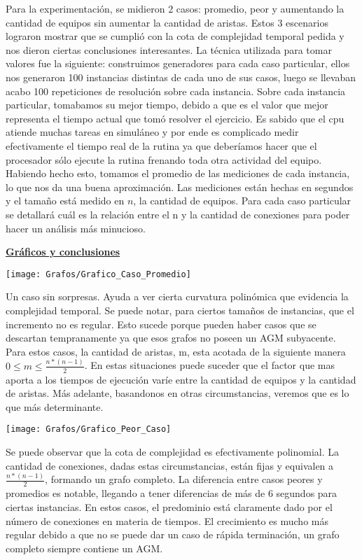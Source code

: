 Para la experimentación, se midieron 2 casos: promedio, peor y aumentando la cantidad de equipos sin aumentar la cantidad de aristas. Estos 3 escenarios lograron mostrar que se cumplió con la cota de complejidad temporal pedida y nos dieron ciertas conclusiones interesantes.
La técnica utilizada para tomar valores fue la siguiente: construimos generadores para cada caso particular, ellos nos generaron 100 instancias distintas de cada uno de sus casos, luego se llevaban acabo 100 repeticiones de resolución sobre cada instancia. Sobre cada instancia particular, tomabamos su mejor tiempo, debido a que es el valor que mejor representa el tiempo actual que tomó resolver el ejercicio. Es sabido que el cpu atiende muchas tareas en simuláneo y por ende es complicado medir efectivamente el tiempo real de la rutina ya que deberíamos hacer que el procesador sólo ejecute la rutina frenando toda otra actividad del equipo. Habiendo hecho esto, tomamos el promedio de las mediciones de cada instancia, lo que nos da una buena aproximación. Las mediciones están hechas en segundos y el tamaño está medido en $n$, la cantidad de equipos. Para cada caso particular se detallará cuál es la relación entre el n y la cantidad de conexiones para poder hacer un análisis más minucioso.

\noindent \textbf{\underline{Gráficos y conclusiones}}

\texttt{[image: Grafos/Grafico\_Caso\_Promedio]}

Un caso sin sorpresas. Ayuda a ver cierta curvatura polinómica que evidencia la complejidad temporal. Se puede notar, para ciertos tamaños de instancias, que el incremento no es regular. Esto sucede porque pueden haber casos que se descartan tempranamente ya que esos grafos no poseen un AGM subyacente. Para estos casos, la cantidad de aristas, m, esta acotada de la siguiente manera $0 \leq m \leq \frac{n*(n-1)}{2}$. En estas situaciones puede suceder que el factor que mas aporta a los tiempos de ejecución varíe entre la cantidad de equipos y la cantidad de aristas. Más adelante, basandonos en otras circumstancias, veremos que es lo que más determinante.

\texttt{[image: Grafos/Grafico\_Peor\_Caso]}

Se puede observar que la cota de complejidad es efectivamente polinomial. La cantidad de conexiones, dadas estas circumstancias, están fijas y equivalen a $\frac{n*(n-1)}{2}$, formando un grafo completo. La diferencia entre casos peores y promedios es notable, llegando a tener diferencias de más de 6 segundos para ciertas instancias. En estos casos, el predominio está claramente dado por el número de conexiones en materia de tiempos. El crecimiento es mucho más regular debido a que no se puede dar un caso de rápida terminación, un grafo completo siempre contiene un AGM.

